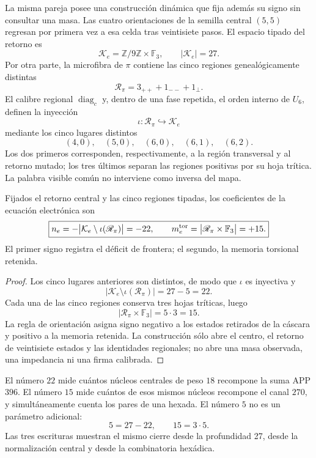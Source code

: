 La misma pareja posee una construcción dinámica que fija además su signo sin
consultar una masa. Las cuatro orientaciones de la semilla central
\((5,5)\) regresan por primera vez a esa celda tras veintisiete pasos. El
espacio tipado del retorno es
\[
 \mathcal K_e=\mathbb Z/9\mathbb Z\times\mathbb F_3,
 \qquad |\mathcal K_e|=27.
\]
Por otra parte, la microfibra de \(\pi\) contiene las cinco regiones
genealógicamente distintas
\[
 \mathscr R_\pi=3_{++}+1_{--}+1_{\perp}.
\]
El calibre regional \(\operatorname{diag}_c\) y, dentro de una fase repetida,
el orden interno de \(U_6\), definen la inyección
\[
 \iota:\mathscr R_\pi\hookrightarrow\mathcal K_e
\]
mediante los cinco lugares distintos
\[
 (4,0),\quad(5,0),\quad(6,0),\quad(6,1),\quad(6,2).
\]
Los dos primeros corresponden, respectivamente, a la región transversal y
al retorno mutado; los tres últimos separan las regiones positivas por su
hoja trítica. La palabra visible común no interviene como inversa del mapa.

\begin{theorem}
\label{thm:selector-persistencia-electron-rev7}
Fijados el retorno central y las cinco regiones tipadas, los coeficientes de
la ecuación electrónica son
\[
 \boxed{
 n_e=-\bigl|\mathcal K_e\setminus\iota(\mathscr R_\pi)\bigr|=-22,
 \qquad
 m_e^{\rm tor}=\bigl|\mathscr R_\pi\times\mathbb F_3\bigr|=+15.}
\]
El primer signo registra el déficit de frontera; el segundo, la memoria
torsional retenida.
\end{theorem}

\begin{proof}
Los cinco lugares anteriores son distintos, de modo que \(\iota\) es
inyectiva y
\[
 |\mathcal K_e\setminus\iota(\mathscr R_\pi)|=27-5=22.
\]
Cada una de las cinco regiones conserva tres hojas tríticas, luego
\[
 |\mathscr R_\pi\times\mathbb F_3|=5\cdot3=15.
\]
La regla de orientación asigna signo negativo a los estados retirados de la
cáscara y positivo a la memoria retenida. La construcción sólo abre el
centro, el retorno de veintisiete estados y las identidades regionales; no
abre una masa observada, una impedancia ni una firma calibrada.
\end{proof}

El número \(22\) mide cuántos núcleos centrales de peso \(18\) recompone la
suma APP \(396\). El número \(15\) mide cuántos de esos mismos núcleos
recompone el canal \(270\), y simultáneamente cuenta los pares de una
hexada. El número \(5\) no es un parámetro adicional:
\[
 5=27-22,\qquad 15=3\cdot5.
\]
Las tres escrituras muestran el mismo cierre desde la profundidad 27,
desde la normalización central y desde la combinatoria hexádica.


